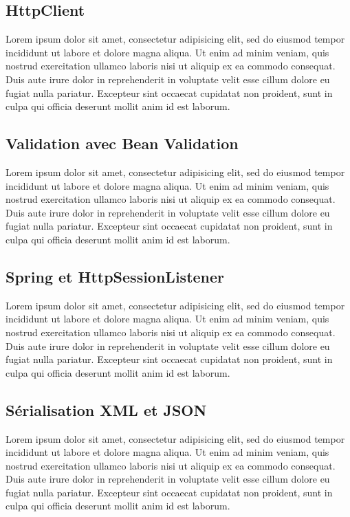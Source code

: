 \documentclass{article}
\begin{document}
\subsection{HttpClient} %
\label{sub:httpclient}
Lorem ipsum dolor sit amet, consectetur adipisicing elit, sed do eiusmod tempor incididunt ut labore et dolore magna aliqua. Ut enim ad minim veniam, quis nostrud exercitation ullamco laboris nisi ut aliquip ex ea commodo consequat. Duis aute irure dolor in reprehenderit in voluptate velit esse cillum dolore eu fugiat nulla pariatur. Excepteur sint occaecat cupidatat non proident, sunt in culpa qui officia deserunt mollit anim id est laborum.

\subsection{Validation avec Bean Validation} %
\label{sub:validation_avec_bean_validation}
Lorem ipsum dolor sit amet, consectetur adipisicing elit, sed do eiusmod tempor incididunt ut labore et dolore magna aliqua. Ut enim ad minim veniam, quis nostrud exercitation ullamco laboris nisi ut aliquip ex ea commodo consequat. Duis aute irure dolor in reprehenderit in voluptate velit esse cillum dolore eu fugiat nulla pariatur. Excepteur sint occaecat cupidatat non proident, sunt in culpa qui officia deserunt mollit anim id est laborum.

\subsection{Spring et HttpSessionListener} %
\label{sub:spring_et_httpsessionlistener}
Lorem ipsum dolor sit amet, consectetur adipisicing elit, sed do eiusmod tempor incididunt ut labore et dolore magna aliqua. Ut enim ad minim veniam, quis nostrud exercitation ullamco laboris nisi ut aliquip ex ea commodo consequat. Duis aute irure dolor in reprehenderit in voluptate velit esse cillum dolore eu fugiat nulla pariatur. Excepteur sint occaecat cupidatat non proident, sunt in culpa qui officia deserunt mollit anim id est laborum.

\subsection{Sérialisation XML et JSON} %
\label{sub:serialisation_xml_et_json}
Lorem ipsum dolor sit amet, consectetur adipisicing elit, sed do eiusmod tempor incididunt ut labore et dolore magna aliqua. Ut enim ad minim veniam, quis nostrud exercitation ullamco laboris nisi ut aliquip ex ea commodo consequat. Duis aute irure dolor in reprehenderit in voluptate velit esse cillum dolore eu fugiat nulla pariatur. Excepteur sint occaecat cupidatat non proident, sunt in culpa qui officia deserunt mollit anim id est laborum.
\end{document}
